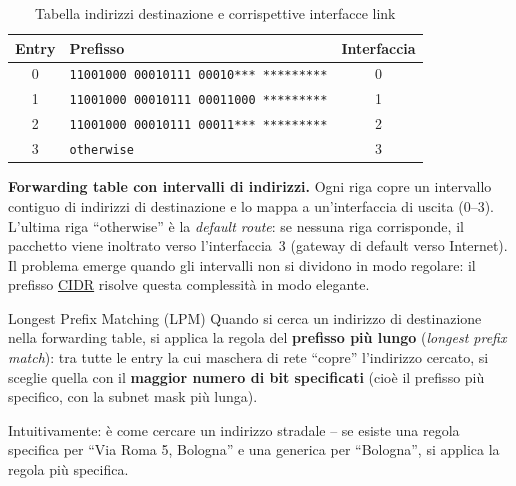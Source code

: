 \documentclass[a4paper,12pt]{report}
\begin{document}
\begin{table}[H] %
\centering
\caption{Tabella indirizzi destinazione e corrispettive interfacce link}
\label{tab:indirizzi} %
\begin{tabular}{clc}
\toprule
\textbf{Entry} & \textbf{Prefisso} & \textbf{Interfaccia} \\
\midrule
0 & \texttt{11001000 00010111 00010{*}{*}{*} {*}{*}{*}{*}{*}{*}{*}{*}{*}} & 0 \\
1 & \texttt{11001000 00010111 00011000 {*}{*}{*}{*}{*}{*}{*}{*}{*}} & 1 \\
2 & \texttt{11001000 00010111 00011{*}{*}{*} {*}{*}{*}{*}{*}{*}{*}{*}{*}} & 2 \\
3 & \texttt{otherwise} & 3 \\
\bottomrule
\end{tabular}
\end{table}

        \textbf{Forwarding table con intervalli di indirizzi.}
        Ogni riga copre un intervallo contiguo di indirizzi di destinazione
        e lo mappa a un'interfaccia di uscita (0--3). L'ultima riga
        ``otherwise'' è la \textit{default route}: se nessuna riga
        corrisponde, il pacchetto viene inoltrato verso l'interfaccia~3
        (gateway di default verso Internet).
        Il problema emerge quando gli intervalli non si dividono in modo
        regolare: il prefisso \hyperref[section:CIDR]{CIDR} risolve questa complessità in modo
        elegante.%


\begin{defbox}{Longest Prefix Matching (LPM)}
Quando si cerca un indirizzo di destinazione nella forwarding table, si
applica la regola del \textbf{prefisso più lungo} (\textit{longest prefix
match}): tra tutte le entry la cui maschera di rete ``copre'' l'indirizzo
cercato, si sceglie quella con il \textbf{maggior numero di bit specificati}
(cioè il prefisso più specifico, con la subnet mask più lunga).

Intuitivamente: è come cercare un indirizzo stradale -- se esiste una regola
specifica per ``Via Roma 5, Bologna'' e una generica per ``Bologna'', si
applica la regola più specifica.
\end{defbox}
\end{document}
